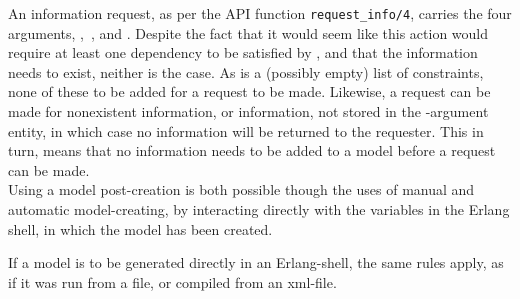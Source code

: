 \newpage
\noindent

An information request, as per the API function \lstinline{request_info/4}, carries the four arguments, , ,  and . Despite the fact that it would seem like this action would require at least one dependency to be satisfied by , and that the information needs to exist, neither is the case. As  is a (possibly empty) list of constraints, none of these  to be added for a request to be made. Likewise, a request can be made for nonexistent information, or information, not stored in the -argument entity, in which case no information will be returned to the requester. This in turn, means that no information needs to be added to a model before a request can be made.\\[0.1cm]
Using a model post-creation is both possible though the uses of manual and automatic model-creating, by interacting directly with the variables in the Erlang shell, in which the model has been created. 

If a model is to be generated directly in an Erlang-shell, the same rules apply, as if it was run from a file, or compiled from an xml-file.
